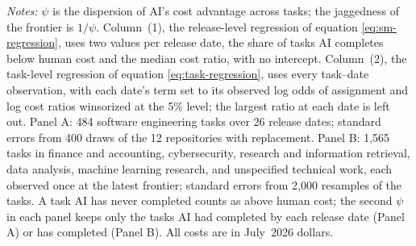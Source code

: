 \documentclass[11pt]{article}
\begin{document}
\begin{table}[t]
\centering \caption{Estimates of $\psi$, the inverse jaggedness of the AI frontier}
\label{tab:two-estimates} 

\end{table}

{{\footnotesize\textit{Notes:}}{\footnotesize{}
$\psi$ is the dispersion of AI's cost advantage across tasks; the
jaggedness of the frontier is $1/\psi$. Column~(1), the release-level
regression of equation \eqref{eq:sm-regression}, uses two values
per release date, the share of tasks AI completes below human cost
and the median cost ratio, with no intercept. Column~(2), the task-level
regression of equation \eqref{eq:task-regression}, uses every task--date
observation, with each date's term set to its observed log odds of
assignment and log cost ratios winsorized at the 5\% level; the largest
ratio at each date is left out. Panel A: 484 software engineering
tasks over 26 release dates; standard errors from
400 draws of the 12 repositories
with replacement. Panel B: 1{,}565 tasks in finance and accounting, cybersecurity, research and information retrieval, data analysis, machine learning research, and unspecified technical work,
each observed once at the latest frontier; standard errors from 2{,}000
resamples of the tasks. A task AI has never completed counts as above
human cost; the second $\psi$ in each panel keeps only the tasks
AI had completed by each release date (Panel A) or has completed (Panel
B). All costs are in July~2026 dollars.}{\footnotesize\par}

}
\end{document}
